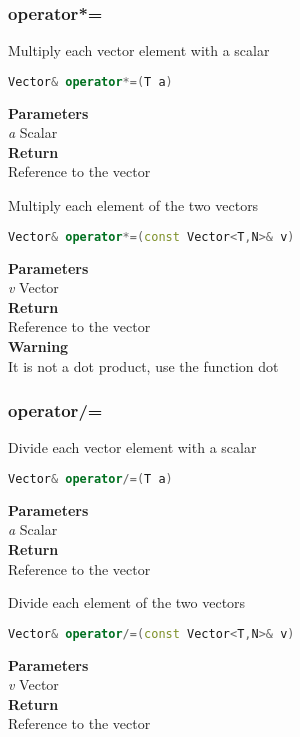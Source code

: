 \subsubsection{operator*=}
\begin{mdframed}
Multiply each vector element with a scalar
\begin{lstlisting}[language=C++]
Vector& operator*=(T a)
\end{lstlisting}
\textbf{Parameters} \\ 
\textit{a} Scalar \\ 
\textbf{Return} \\ 
Reference to the vector\\ 
\end{mdframed}

\begin{mdframed}
Multiply each element of the two vectors
\begin{lstlisting}[language=C++]
Vector& operator*=(const Vector<T,N>& v)
\end{lstlisting}
\textbf{Parameters} \\ 
\textit{v} Vector \\ 
\textbf{Return} \\ 
Reference to the vector\\ 
\textbf{Warning} \\ 
It is not a dot product, use the function dot\\ 
\end{mdframed}

\subsubsection{operator/=}
\begin{mdframed}
Divide each vector element with a scalar
\begin{lstlisting}[language=C++]
Vector& operator/=(T a)
\end{lstlisting}
\textbf{Parameters} \\ 
\textit{a} Scalar \\ 
\textbf{Return} \\ 
Reference to the vector\\ 
\end{mdframed}

\begin{mdframed}
Divide each element of the two vectors
\begin{lstlisting}[language=C++]
Vector& operator/=(const Vector<T,N>& v)
\end{lstlisting}
\textbf{Parameters} \\ 
\textit{v} Vector \\ 
\textbf{Return} \\ 
Reference to the vector\\ 
\end{mdframed}


